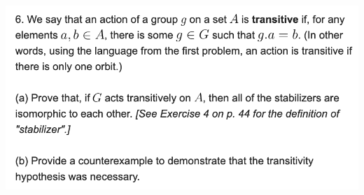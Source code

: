 \begin{mdframed}
\includegraphics[width=400pt]{img/abstract-algebra--nf--4-50ae.png}
\end{mdframed}
